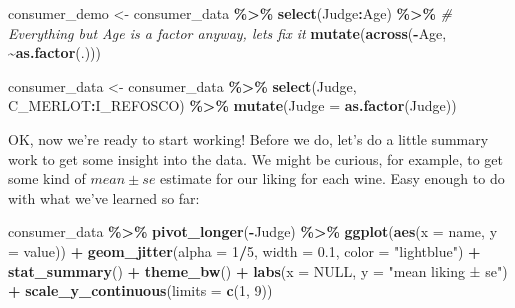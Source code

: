 \documentclass[
]{book}
\newenvironment{Shaded}{\begin{snugshade}}{\end{snugshade}}
\newcommand{\AttributeTok}[1]{\textcolor[rgb]{0.13,0.29,0.53}{#1}}
\newcommand{\CommentTok}[1]{\textcolor[rgb]{0.56,0.35,0.01}{\textit{#1}}}
\newcommand{\ConstantTok}[1]{\textcolor[rgb]{0.56,0.35,0.01}{#1}}
\newcommand{\DecValTok}[1]{\textcolor[rgb]{0.00,0.00,0.81}{#1}}
\newcommand{\FloatTok}[1]{\textcolor[rgb]{0.00,0.00,0.81}{#1}}
\newcommand{\FunctionTok}[1]{\textcolor[rgb]{0.13,0.29,0.53}{\textbf{#1}}}
\newcommand{\NormalTok}[1]{#1}
\newcommand{\OtherTok}[1]{\textcolor[rgb]{0.56,0.35,0.01}{#1}}
\newcommand{\SpecialCharTok}[1]{\textcolor[rgb]{0.81,0.36,0.00}{\textbf{#1}}}
\newcommand{\StringTok}[1]{\textcolor[rgb]{0.31,0.60,0.02}{#1}}
\begin{document}
\begin{Shaded}
\begin{Highlighting}[]
\NormalTok{consumer\_demo }\OtherTok{\textless{}{-}} 
\NormalTok{  consumer\_data }\SpecialCharTok{\%\textgreater{}\%}
  \FunctionTok{select}\NormalTok{(Judge}\SpecialCharTok{:}\NormalTok{Age) }\SpecialCharTok{\%\textgreater{}\%}
  \CommentTok{\# Everything but Age is a factor anyway, let\textquotesingle{}s fix it}
  \FunctionTok{mutate}\NormalTok{(}\FunctionTok{across}\NormalTok{(}\SpecialCharTok{{-}}\NormalTok{Age, }\SpecialCharTok{\textasciitilde{}}\FunctionTok{as.factor}\NormalTok{(.)))}

\NormalTok{consumer\_data }\OtherTok{\textless{}{-}} 
\NormalTok{  consumer\_data }\SpecialCharTok{\%\textgreater{}\%}
  \FunctionTok{select}\NormalTok{(Judge, C\_MERLOT}\SpecialCharTok{:}\NormalTok{I\_REFOSCO) }\SpecialCharTok{\%\textgreater{}\%}
  \FunctionTok{mutate}\NormalTok{(}\AttributeTok{Judge =} \FunctionTok{as.factor}\NormalTok{(Judge))}
\end{Highlighting}
\end{Shaded}

OK, now we're ready to start working! Before we do, let's do a little summary work to get some insight into the data. We might be curious, for example, to get some kind of \(mean±se\) estimate for our liking for each wine. Easy enough to do with what we've learned so far:

\begin{Shaded}
\begin{Highlighting}[]
\NormalTok{consumer\_data }\SpecialCharTok{\%\textgreater{}\%}
  \FunctionTok{pivot\_longer}\NormalTok{(}\SpecialCharTok{{-}}\NormalTok{Judge) }\SpecialCharTok{\%\textgreater{}\%}
  \FunctionTok{ggplot}\NormalTok{(}\FunctionTok{aes}\NormalTok{(}\AttributeTok{x =}\NormalTok{ name, }\AttributeTok{y =}\NormalTok{ value)) }\SpecialCharTok{+} 
  \FunctionTok{geom\_jitter}\NormalTok{(}\AttributeTok{alpha =} \DecValTok{1}\SpecialCharTok{/}\DecValTok{5}\NormalTok{, }\AttributeTok{width =} \FloatTok{0.1}\NormalTok{, }\AttributeTok{color =} \StringTok{"lightblue"}\NormalTok{) }\SpecialCharTok{+}
  \FunctionTok{stat\_summary}\NormalTok{() }\SpecialCharTok{+}
  \FunctionTok{theme\_bw}\NormalTok{() }\SpecialCharTok{+} 
  \FunctionTok{labs}\NormalTok{(}\AttributeTok{x =} \ConstantTok{NULL}\NormalTok{, }\AttributeTok{y =} \StringTok{"mean liking ± se"}\NormalTok{) }\SpecialCharTok{+} 
  \FunctionTok{scale\_y\_continuous}\NormalTok{(}\AttributeTok{limits =} \FunctionTok{c}\NormalTok{(}\DecValTok{1}\NormalTok{, }\DecValTok{9}\NormalTok{))}
\end{Highlighting}
\end{Shaded}
\end{document}
